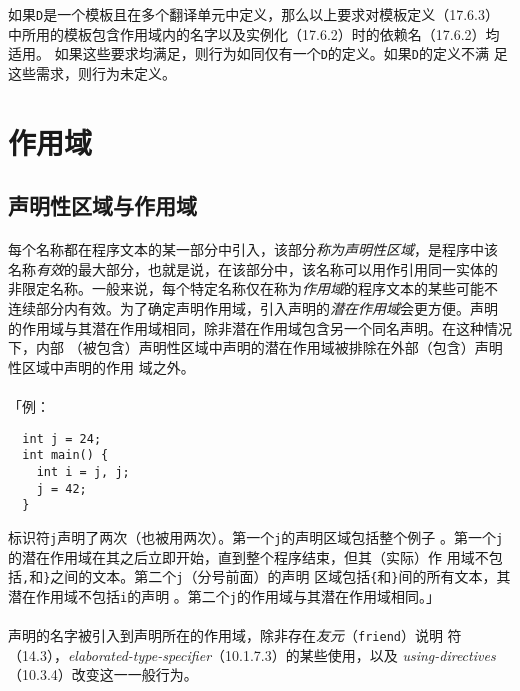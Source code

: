 如果\texttt{D}是一个模板且在多个翻译单元中定义，那么以上要求对模板定义（17.6.3）
中所用的模板包含作用域内的名字以及实例化（17.6.2）时的依赖名（17.6.2）均适用。
如果这些要求均满足，则行为如同仅有一个\texttt{D}的定义。如果\texttt{D}的定义不满
足这些需求，则行为未定义。


\section{作用域}
\subsection{声明性区域与作用域}

\paragraph{}
每个名称都在程序文本的某一部分中引入，该部分\textit{称为声明性区域}，是程序中该
名称\textit{有效}的最大部分，也就是说，在该部分中，该名称可以用作引用同一实体的
非限定名称。一般来说，每个特定名称仅在称为\textit{作用域}的程序文本的某些可能不
连续部分内有效。为了确定声明作用域，引入声明的\textit{潜在作用域}会更方便。声明
的作用域与其潜在作用域相同，除非潜在作用域包含另一个同名声明。在这种情况下，内部
（被包含）声明性区域中声明的潜在作用域被排除在外部（包含）声明性区域中声明的作用
域之外。

\paragraph{}
「例：
\begin{lstlisting}
  int j = 24;
  int main() {
    int i = j, j;
    j = 42;
  }
\end{lstlisting}
标识符\texttt{j}声明了两次（也被用两次）。第一个\texttt{j}的声明区域包括整个例子
。第一个\texttt{j}的潜在作用域在其之后立即开始，直到整个程序结束，但其（实际）作
用域不包括\texttt{,}和\texttt{\}}之间的文本。第二个\texttt{j}（分号前面）的声明
区域包括\texttt{\{}和\texttt{\}}间的所有文本，其潜在作用域不包括\texttt{i}的声明
。第二个\texttt{j}的作用域与其潜在作用域相同。」

\paragraph{}
声明的名字被引入到声明所在的作用域，除非存在\textit{友元}（\texttt{friend}）说明
符（14.3），\textit{elaborated-type-specifier}（10.1.7.3）的某些使用，以及
\textit{using-directives}（10.3.4）改变这一一般行为。

